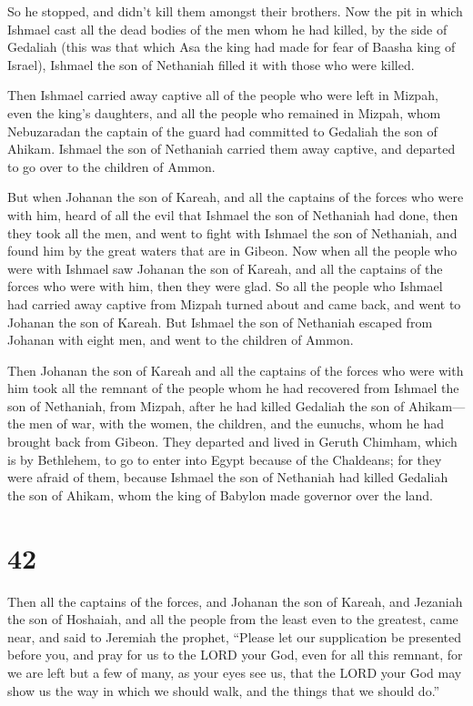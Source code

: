 So he stopped, and didn't kill them amongst their brothers. 
Now the pit in which Ishmael cast all the dead bodies of the men whom he
had killed, by the side of Gedaliah (this was that which Asa the king
had made for fear of Baasha king of Israel), Ishmael the son of
Nethaniah filled it with those who were killed.

 Then Ishmael carried away captive all of the people who
were left in Mizpah, even the king's daughters, and all the people who
remained in Mizpah, whom Nebuzaradan the captain of the guard had
committed to Gedaliah the son of Ahikam. Ishmael the son of Nethaniah
carried them away captive, and departed to go over to the children of
Ammon.

 But when Johanan the son of Kareah, and all the captains
of the forces who were with him, heard of all the evil that Ishmael the
son of Nethaniah had done,  then they took all the men, and
went to fight with Ishmael the son of Nethaniah, and found him by the
great waters that are in Gibeon.  Now when all the people
who were with Ishmael saw Johanan the son of Kareah, and all the
captains of the forces who were with him, then they were glad.
 So all the people who Ishmael had carried away captive
from Mizpah turned about and came back, and went to Johanan the son of
Kareah.  But Ishmael the son of Nethaniah escaped from
Johanan with eight men, and went to the children of Ammon.

 Then Johanan the son of Kareah and all the captains of the
forces who were with him took all the remnant of the people whom he had
recovered from Ishmael the son of Nethaniah, from Mizpah, after he had
killed Gedaliah the son of Ahikam---the men of war, with the women, the
children, and the eunuchs, whom he had brought back from Gibeon.
 They departed and lived in Geruth Chimham, which is by
Bethlehem, to go to enter into Egypt  because of the
Chaldeans; for they were afraid of them, because Ishmael the son of
Nethaniah had killed Gedaliah the son of Ahikam, whom the king of
Babylon made governor over the land.

\hypertarget{section-41}{%
\section{42}\label{section-41}}

 Then all the captains of the forces, and Johanan the son of
Kareah, and Jezaniah the son of Hoshaiah, and all the people from the
least even to the greatest, came near,  and said to Jeremiah
the prophet, ``Please let our supplication be presented before you, and
pray for us to the LORD your God, even for all this remnant, for we are
left but a few of many, as your eyes see us,  that the LORD
your God may show us the way in which we should walk, and the things
that we should do.''

